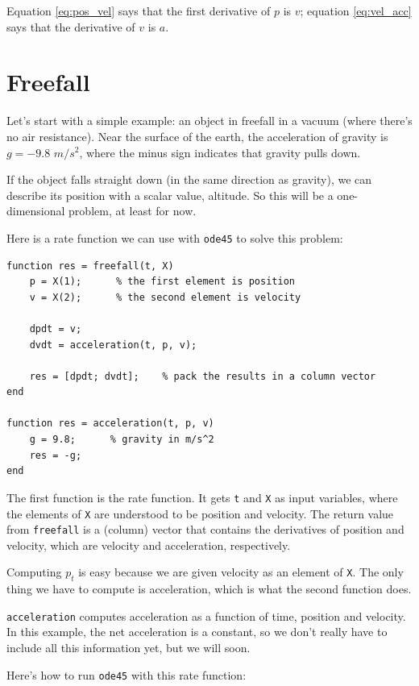 \documentclass{book}
\begin{document}
Equation \eqref{eq:pos_vel} says that the first derivative of $p$ is $v$;
equation \eqref{eq:vel_acc} says that the derivative of $v$ is $a$.


\section{Freefall}
\label{freefall}

Let's start with a simple example: an object in freefall in a vacuum
(where there's no air resistance).  Near the surface of the earth, the
acceleration of gravity is $g = -9.8$ $m/s^2$, where the minus sign
indicates that gravity pulls down.

If the object falls straight down (in the same direction as gravity),
we can describe its position with a scalar value, altitude.  So
this will be a one-dimensional problem, at least for now.

Here is a rate function we can use with {\tt ode45} to solve
this problem:

\begin{verbatim}
function res = freefall(t, X)
    p = X(1);      % the first element is position
    v = X(2);      % the second element is velocity

    dpdt = v;
    dvdt = acceleration(t, p, v);

    res = [dpdt; dvdt];    % pack the results in a column vector
end

function res = acceleration(t, p, v)
    g = 9.8;      % gravity in m/s^2
    res = -g;
end
\end{verbatim}

The first function is the rate function.  It gets {\tt t} and
{\tt X} as input variables, where the elements of {\tt X} are understood
to be position and velocity.  The return value from {\tt freefall}
is a (column) vector that contains the derivatives of position
and velocity, which are velocity and acceleration, respectively.

Computing $p_t$ is easy because we are given velocity
as an element of {\tt X}.  The only thing we have to compute is
acceleration, which is what the second function does.

{\tt acceleration} computes acceleration as a function of time,
position and velocity.  In this example, the net acceleration is
a constant, so we don't really have to include all this information
yet, but we will soon.

Here's how to run {\tt ode45} with this rate function:
\end{document}
